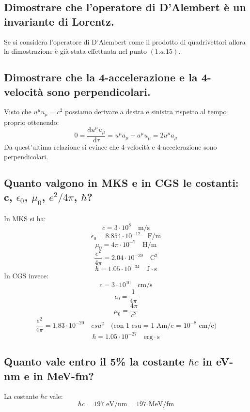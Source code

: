 \subsection[]{Dimostrare che l'operatore di D'Alembert è un invariante di Lorentz.} 
Se si considera l'operatore di D'Alembert come il prodotto di quadrivettori allora la dimostrazione è già stata effettuata nel punto $(1.a.15)$.
\subsection[]{Dimostrare che la 4-accelerazione e la 4-velocità sono perpendicolari.} 
Visto che $u^{\mu}u_{\mu} = c^{2}$ possiamo derivare a destra e sinistra rispetto al tempo proprio ottenendo:
\[
	0 = \frac{\mbox{d} u^{\mu}u_{\mu}}{\mbox{d} \tau} = u^{\mu}a_{\mu} + a^{\mu}u_{\mu} = 2 u^{\mu}a_{\mu}
\] 
Da quest'ultima relazione si evince che 4-velocità e 4-accelerazione sono perpendicolari.
\subsection[]{ Quanto valgono in MKS e in CGS le costanti: c, $\epsilon_0$,  $\mu_0$, $e^2/4\pi$,  $\hbar$?} 
In MKS si ha:
\[
	c = 3 \cdot 10^{8} \quad \text{m/s}
\] 
\[
	\epsilon_0 = 8.854 \cdot 10^{-12} \quad \text{F/m}
\]
\[
	\mu_0 = 4\pi \cdot 10^{-7} \quad \text{H/m}
\] 
\[
	\frac{e^{2}}{4\pi} = 2.04 \cdot 10^{-39} \quad \text{C}^{2}
\] 
\[
	\hbar = 1.05 \cdot 10^{-34} \quad \text{J} \cdot \text{s}
\] 
In CGS invece:
\[
	c = 3 \cdot 10^{10} \quad \text{cm/s}
\] 
\[
	\epsilon_0 = \frac{1}{4\pi}
\]
\[
	\mu_0 = \frac{4\pi}{c^{2}} 
\] 
\[
	\frac{e^{2}}{4\pi} = 1.83 \cdot 10^{-20} \quad esu^{2} \quad \text{(con 1 esu = 1 Am/c = $10^{-8}$ cm/c)} 
\] 
\[
	\hbar = 1.05 \cdot 10^{-27} \quad \text{erg} \cdot \text{s}
\]

\subsection[]{Quanto vale entro il 5\% la costante $\hbar c$ in eV-nm e in MeV-fm?}
La costante $\hbar c$ vale:
\[
	\hbar c = 197 \text{ eV/nm} = 197 \text{ MeV/fm}
\]  

